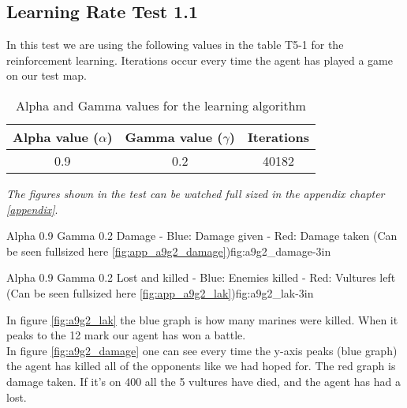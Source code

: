 \subsection*{Learning Rate Test 1.1}
In this test we are using the following values in the table T5-1 for the reinforcement learning. Iterations occur every time the agent has played a game on our test map.


\begin{table}[H]
\begin{centering}
 \begin{tabular}{|c|c|c|}
	\hline
		Alpha value ($\alpha$) & Gamma value ($\gamma$) & Iterations\\
	\hline
		0.9 & 0.2 & 40182 \\
	\hline
\end{tabular}
\label{tab:agtable}
\caption{Alpha and Gamma values for the learning algorithm}
\end{centering}
\end{table}



\textit{The figures shown in the test can be watched full sized in the appendix chapter \ref{appendix}}.

			{Alpha 0.9 Gamma 0.2 Damage - Blue: Damage given - Red: Damage taken (Can be seen fullsized here \ref{fig:app_a9g2_damage})}{fig:a9g2_damage}{-3in}

			{Alpha 0.9 Gamma 0.2 Lost and killed - Blue: Enemies killed - Red: Vultures left (Can be seen fullsized here \ref{fig:app_a9g2_lak})}{fig:a9g2_lak}{-3in}
			
			
In figure \ref{fig:a9g2_lak} the blue graph is how many marines were killed. When it peaks to the 12 mark our agent has won a battle.\\




In figure \ref{fig:a9g2_damage} one can see every time the y-axis peaks (blue graph) the agent has killed all of the opponents like we had hoped for. The red graph is damage taken. If it's on 400 all the 5 vultures have died, and the agent has had a lost.

